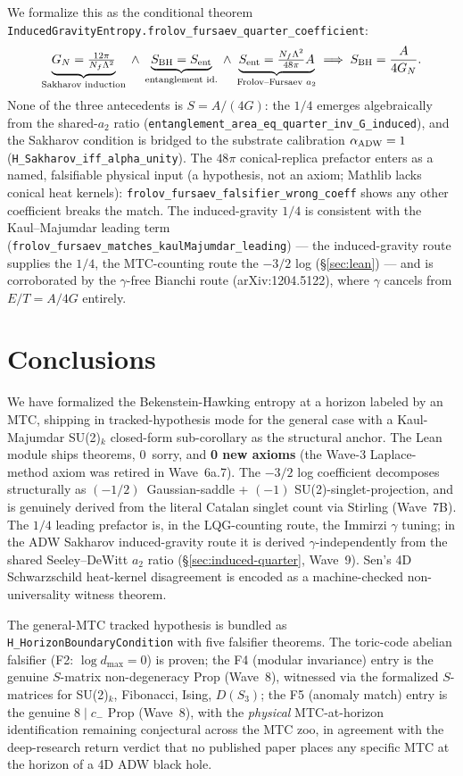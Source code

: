 \documentclass[aps,prd,twocolumn,showpacs,superscriptaddress,nofootinbib]{revtex4-2}
\newcommand{\Imm}{\gamma}
\newcommand{\dmax}{d_{\max}}
\begin{document}
We formalize this as the conditional theorem
\texttt{InducedGravityEntropy.frolov\_fursaev\_quarter\_coefficient}:
\[
  \underbrace{G_N = \tfrac{12\pi}{N_f\Lambda^2}}_{\text{Sakharov induction}} \;\wedge\;
  \underbrace{S_{\rm BH} = S_{\rm ent}}_{\text{entanglement id.}} \;\wedge\;
  \underbrace{S_{\rm ent} = \tfrac{N_f\Lambda^2}{48\pi}A}_{\text{Frolov--Fursaev } a_2}
  \;\Longrightarrow\; S_{\rm BH} = \frac{A}{4 G_N}.
\]
None of the three antecedents is $S = A/(4G)$: the $1/4$ emerges algebraically from the
shared-$a_2$ ratio (\texttt{entanglement\_area\_eq\_quarter\_inv\_G\_induced}), and the
Sakharov condition is bridged to the substrate calibration $\alpha_{\rm ADW}=1$
(\texttt{H\_Sakharov\_iff\_alpha\_unity}). The $48\pi$ conical-replica prefactor enters as a
named, falsifiable physical input (a hypothesis, not an axiom; Mathlib lacks conical heat
kernels): \texttt{frolov\_fursaev\_falsifier\_wrong\_coeff} shows any other coefficient
breaks the match. The induced-gravity $1/4$ is consistent with the Kaul--Majumdar leading
term (\texttt{frolov\_fursaev\_matches\_kaulMajumdar\_leading}) --- the induced-gravity route
supplies the $1/4$, the MTC-counting route the $-3/2$ log (\S\ref{sec:lean}) --- and is
corroborated by the $\Imm$-free Bianchi route (arXiv:1204.5122), where $\Imm$ cancels from
$E/T = A/4G$ entirely.

\section{Conclusions}

We have formalized the Bekenstein-Hawking entropy at a horizon
labeled by an MTC, shipping in tracked-hypothesis mode for the
general case with a Kaul-Majumdar SU(2)$_k$ closed-form
sub-corollary as the structural anchor. The Lean module ships
\bhEntropyTotal{} theorems, 0~sorry, and \textbf{0 new axioms} (the
Wave-3 Laplace-method axiom was retired in Wave~6a.7). The $-3/2$
log coefficient decomposes structurally as
$(-1/2)$~Gaussian-saddle + $(-1)$ SU(2)-singlet-projection, and is
genuinely derived from the literal Catalan singlet count via Stirling
(Wave~7B). The $1/4$ leading prefactor is, in the LQG-counting route, the
Immirzi $\Imm$ tuning; in the ADW Sakharov induced-gravity route it is
derived $\Imm$-independently from the shared Seeley--DeWitt $a_2$ ratio
(\S\ref{sec:induced-quarter}, Wave~9). Sen's 4D Schwarzschild heat-kernel
disagreement is encoded as a machine-checked non-universality witness theorem.

The general-MTC tracked hypothesis is bundled as
\texttt{H\_HorizonBoundaryCondition} with five falsifier theorems.
The toric-code abelian falsifier (F2: $\log\dmax = 0$) is proven;
the F4 (modular invariance) entry is the genuine $S$-matrix non-degeneracy
Prop (Wave~8), witnessed via the formalized $S$-matrices for SU(2)$_k$,
Fibonacci, Ising, $D(S_3)$; the F5 (anomaly match) entry is the genuine
$8 \mid c_-$ Prop (Wave~8), with the \emph{physical} MTC-at-horizon
identification remaining conjectural across the MTC zoo, in agreement with
the deep-research return verdict
that no published paper places any specific MTC at the horizon of a
4D ADW black hole.
\end{document}
